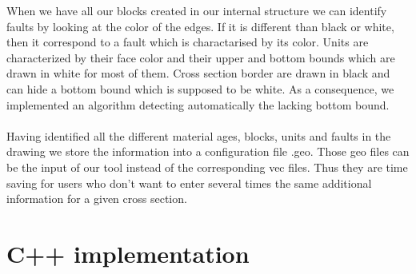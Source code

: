 \documentclass[12pt, a4paper]{report} %
\begin{document}
When we have all our blocks created in our internal structure we can identify faults by looking at the color of the edges. If it is different than black or white, then it correspond to a fault which is charactarised by its color. Units are characterized by their face color and their upper and bottom bounds which are drawn in white for most of them. Cross section border are drawn in black and can hide a bottom bound which is supposed to be white. As a consequence, we implemented an algorithm  detecting automatically the lacking bottom bound.\\\\
Having identified all the different material ages, blocks, units and faults in the drawing we store the information into a configuration file .geo. Those geo files can be the input of our tool instead of the corresponding vec files. Thus they  are time saving for users who don't want to enter several times the same additional information for a given cross section.

\section{C++ implementation}  
  
\end{document}
